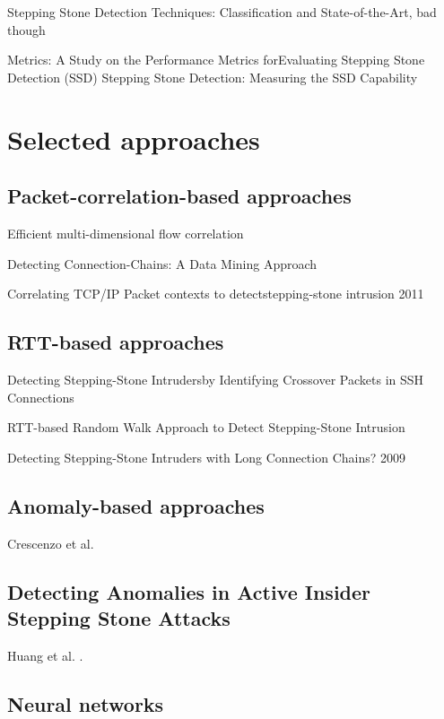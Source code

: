 \documentclass[conference]{IEEEtran}\usepackage[]{graphicx}\usepackage[]{color}
\begin{document}
\cite{almulhem2007survey}

Stepping Stone Detection Techniques: Classification and State-of-the-Art, bad though

Metrics: A Study on the Performance Metrics forEvaluating Stepping Stone Detection (SSD)
Stepping Stone Detection: Measuring the SSD Capability


\section{Selected approaches}

\subsection{Packet-correlation-based approaches}

Efficient multi-dimensional flow correlation

Detecting Connection-Chains: A Data Mining Approach

Correlating TCP/IP Packet contexts to detectstepping-stone intrusion 2011

\subsection{RTT-based approaches}

Detecting Stepping-Stone Intrudersby Identifying Crossover Packets in SSH Connections

RTT-based Random Walk Approach to Detect Stepping-Stone Intrusion 

Detecting Stepping-Stone Intruders with Long Connection Chains? 2009


\subsection{Anomaly-based approaches}

Crescenzo et al. \cite{di2011detecting}
\subsection{Detecting Anomalies in Active Insider Stepping Stone Attacks}

Huang et al. \cite{huang2011detecting}.

\subsection{Neural networks}
\end{document}
